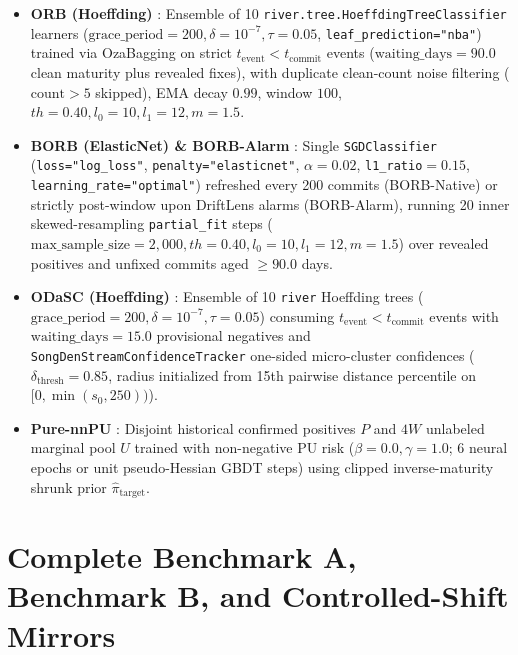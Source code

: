 \documentclass[10pt,a4paper]{article}
\begin{document}
\begin{itemize}[leftmargin=1.6em,itemsep=0.06em]
  \item \textbf{ORB (Hoeffding)} \citep{cabral2019class}: Ensemble of 10 \texttt{river.tree.HoeffdingTreeClassifier} learners ($\text{grace\_period}=200, \delta=10^{-7}, \tau=0.05$, \texttt{leaf\_prediction="nba"}) trained via OzaBagging \citep{oza2005online} on strict $t_{\text{event}} < t_{\text{commit}}$ events ($\text{waiting\_days}=90.0$ clean maturity plus revealed fixes), with duplicate clean-count noise filtering ($\text{count}>5$ skipped), EMA decay $0.99$, window $100$, $th=0.40, l_0=10, l_1=12, m=1.5$.
  \item \textbf{BORB (ElasticNet) \& BORB-Alarm} \citep{cabral2023borb}: Single \texttt{SGDClassifier} (\texttt{loss="log\_loss"}, \texttt{penalty="elasticnet"}, $\alpha=0.02$, \texttt{l1\_ratio}$=0.15$, \texttt{learning\_rate="optimal"}) refreshed every 200 commits (BORB-Native) or strictly post-window upon DriftLens alarms (BORB-Alarm), running 20 inner skewed-resampling \texttt{partial\_fit} steps ($\text{max\_sample\_size}=2{,}000, th=0.40, l_0=10, l_1=12, m=1.5$) over revealed positives and unfixed commits aged $\ge 90.0$ days.
  \item \textbf{ODaSC (Hoeffding)} \citep{song2022odasc}: Ensemble of 10 \texttt{river} Hoeffding trees ($\text{grace\_period}=200, \delta=10^{-7}, \tau=0.05$) consuming $t_{\text{event}} < t_{\text{commit}}$ events with $\text{waiting\_days}=15.0$ provisional negatives and \texttt{SongDenStreamConfidenceTracker} one-sided micro-cluster confidences ($\delta_{\text{thresh}}=0.85$, radius initialized from 15th pairwise distance percentile on $[0, \min(s_0, 250))$).
  \item \textbf{Pure-nnPU} \citep{kiryo2017positive}: Disjoint historical confirmed positives $P$ and $4W$ unlabeled marginal pool $U$ trained with non-negative PU risk ($\beta=0.0, \gamma=1.0$; 6 neural epochs or unit pseudo-Hessian GBDT steps) using clipped inverse-maturity shrunk prior $\hat{\pi}_{\text{target}}$.
\end{itemize}

\clearpage
\section{Complete Benchmark A, Benchmark B, and Controlled-Shift Mirrors}
\label{sec:or_rq2}
\end{document}
